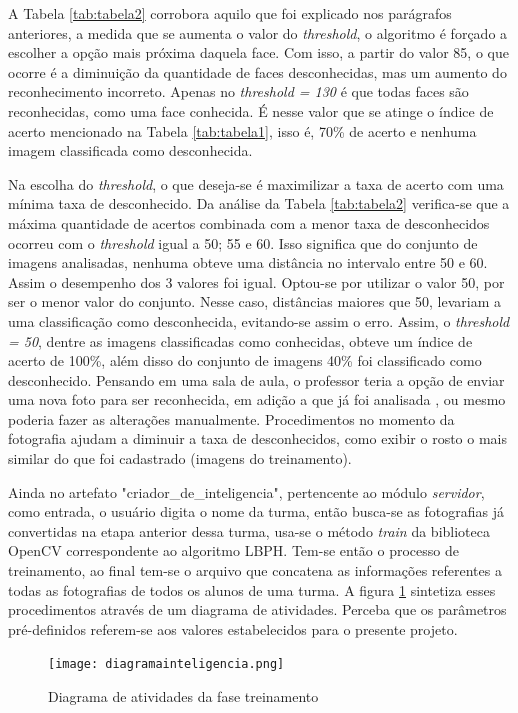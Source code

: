 A Tabela \ref{tab:tabela2} corrobora aquilo que foi explicado nos parágrafos anteriores, a medida que se aumenta o valor do \textit{threshold}, o algoritmo é forçado a escolher a opção mais próxima daquela face. Com isso, a partir do valor 85, o que ocorre é a diminuição da quantidade de faces desconhecidas, mas um aumento do reconhecimento incorreto. Apenas no \textit{threshold = 130} é que todas faces são reconhecidas, como uma face conhecida. É nesse valor que se atinge o índice de acerto mencionado na Tabela \ref{tab:tabela1}, isso é, 70\% de acerto e nenhuma imagem classificada como desconhecida.

Na escolha do \textit{threshold}, o que deseja-se é maximilizar a taxa de acerto com uma mínima taxa de desconhecido. Da análise da Tabela \ref{tab:tabela2} verifica-se que a máxima quantidade de acertos combinada com a menor taxa de desconhecidos ocorreu com o  \textit{threshold} igual a 50; 55 e 60. Isso significa que do conjunto de imagens analisadas, nenhuma obteve uma distância no intervalo entre 50 e 60. Assim o desempenho dos 3 valores foi igual. Optou-se por utilizar o valor 50, por ser o menor valor do conjunto. Nesse caso, distâncias maiores que 50, levariam a uma classificação como desconhecida, evitando-se assim o erro. Assim, o \textit{threshold = 50}, dentre as imagens classificadas como conhecidas, obteve um índice de acerto de 100\%, além disso do conjunto de imagens 40\% foi classificado como desconhecido. Pensando em uma sala de aula, o professor teria a opção de enviar uma nova foto para ser reconhecida, em adição a que já foi analisada , ou mesmo poderia fazer as alterações manualmente. Procedimentos no momento da fotografia ajudam a diminuir a taxa de desconhecidos, como exibir o rosto o mais similar do que foi cadastrado (imagens do treinamento). 

Ainda no artefato "criador\_de\_inteligencia", pertencente ao módulo \textit{servidor}, como entrada, o usuário digita o nome da turma, então busca-se as fotografias já convertidas na etapa anterior dessa turma, usa-se o método \textit{train} da biblioteca OpenCV correspondente ao algoritmo LBPH. Tem-se então o processo de treinamento, ao final tem-se o arquivo que concatena as informações referentes a todas as fotografias de todos os alunos de uma turma. A figura \ref{fig:figura55} sintetiza esses procedimentos através de um diagrama de atividades. Perceba que os parâmetros pré-definidos referem-se aos valores estabelecidos para o presente projeto.


\begin{figure}[!ht]
	\centering
	\texttt{[image: diagramainteligencia.png]}   
	\caption{Diagrama de atividades da fase treinamento}
	\label{fig:figura55}
\end{figure}

